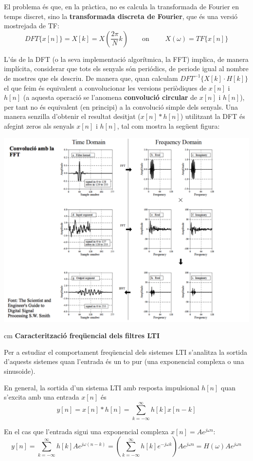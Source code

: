 \documentclass{article}
\begin{document}
El problema és que, en la pràctica, no es calcula la transformada de Fourier en temps discret, sino la \textbf{transformada discreta de Fourier},
que és una versió mostrejada de TF: 
\[
DFT\{x[n]\}=X[k] = X(\frac{2\pi}{N}k) \qquad \text{on } \qquad X(\omega)=TF\{x[n]\}
\]

L'ús de la DFT (o la seva implementació algorítmica, la FFT) implica, de manera implícita, considerar que tots els senyals són periódics, de periode
igual al nombre de mostres que els descriu. De manera que, quan calculam $DFT^{-1} \{ X[k]\cdot H[k] \}$ el que feim és equivalent
a convolucionar les versions periòdiques de $x[n]$ i $h[n]$ (a aquesta operació se l'anomena \textbf{convolució circular} de $x[n]$ i $h[n]$), 
per tant no és equivalent (en principi) a la convolució simple dels senyals. Una manera senzilla d'obtenir el resultat desitjat ($x[n] * h[n]$)
utilitzant la DFT és afegint zeros als senyals $x[n]$ i $h[n]$, tal com mostra la següent figura:

\includegraphics[width=15cm]{fftconv.png}

 cm
\noindent
\textbf{\large Caracterització freqüencial dels filtres LTI}

Per a estudiar el comportament freqüencial dels sistemes LTI s'analitza
la sortida d'aquests sistemes quan l'entrada és un to pur (una exponencial 
complexa o una sinusoide).

En general, la sortida d'un sistema LTI amb resposta impulsional $h[n]$ 
quan s'excita amb una entrada $x[n]$ és
\[
y[n]=x[n] * h[n] = \sum_{k=-\infty}^\infty h[k] x[n-k]
\]

En el cas que l'entrada sigui una exponencial complexa $x[n]=A e^{j \omega n}$:
\[
y[n]=\sum_{k=-\infty}^\infty h[k] A e^{j \omega (n-k)}=\left( \sum_{k=-\infty}^\infty h[k] e^{-j \omega k} \right) A e^{j \omega n}=
H(\omega) A e^{j \omega n}
\]
\end{document}
